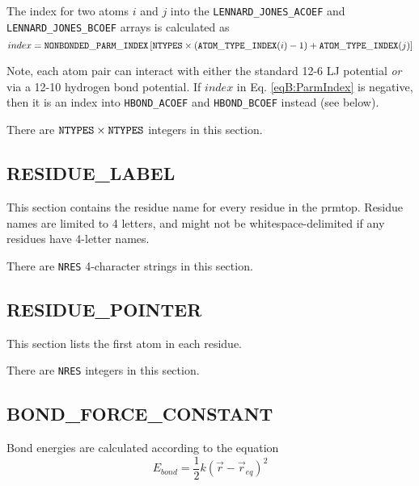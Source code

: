 The index for two atoms $i$ and $j$ into the {\tt LENNARD\_JONES\_ACOEF} and
{\tt LENNARD\_JONES\_BCOEF} arrays is calculated as 
\begin{equation}
   index = {\tt NONBONDED\_PARM\_INDEX} \left [ {\tt NTYPES} \times \left ( {\tt
      ATOM\_TYPE\_INDEX}(i) - 1 \right ) + {\tt ATOM\_TYPE\_INDEX}(j) \right ]
   \label{eqB:ParmIndex}
\end{equation}

Note, each atom pair can interact with either the standard 12-6 LJ potential
\emph{or} via a 12-10 hydrogen bond potential. If $index$ in Eq.
\ref{eqB:ParmIndex} is negative, then it is an index into {\tt HBOND\_ACOEF} and
{\tt HBOND\_BCOEF} instead (see below).


\noindent There are ${\tt NTYPES} \times {\tt NTYPES}$ integers in this section.

\subsection*{RESIDUE\_LABEL}

This section contains the residue name for every residue in the prmtop. Residue
names are limited to 4 letters, and might not be whitespace-delimited if any
residues have 4-letter names.


\noindent There are {\tt NRES} 4-character strings in this section.

\subsection*{RESIDUE\_POINTER}

This section lists the first atom in each residue.


\noindent There are {\tt NRES} integers in this section.

\subsection*{BOND\_FORCE\_CONSTANT}

Bond energies are calculated according to the equation
\begin{equation}
   E_{bond} = \frac 1 2 k \left ( \vec{r} - \vec{r}_{eq} \right ) ^ 2
   \label{eqB:Bond}
\end{equation}

